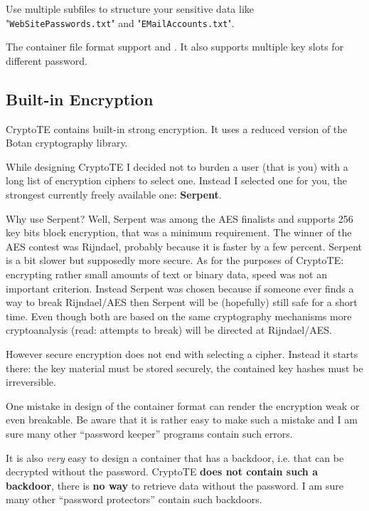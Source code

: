 \documentclass[a4paper,12pt,twoside]{article}
\begin{document}
Use multiple subfiles to structure your sensitive data like "\texttt{Web\-Site\-Passwords.txt}" and "\texttt{EMail\-Accounts.txt}".

The container file format support  and . It also supports multiple key slots for different password.

\subsection{Built-in Encryption}\label{Encryption}

CryptoTE contains built-in strong encryption. It uses a reduced version of the Botan cryptography library.

While designing CryptoTE I decided not to burden a user (that is you) with a long list of encryption ciphers to select one. Instead I selected one for you, the strongest currently freely available one: \textbf{Serpent}.

Why use Serpent? Well, Serpent was among the AES finalists and supports 256 key bits block encryption, that was a minimum requirement. The winner of the AES contest was Rijndael, probably because it is faster by a few percent. Serpent is a bit slower but supposedly more secure. As for the purposes of CryptoTE: encrypting rather small amounts of text or binary data, speed was not an important criterion. Instead Serpent was chosen because if someone ever finds a way to break Rijndael/AES then Serpent will be (hopefully) still safe for a short time. Even though both are based on the same cryptography mechanisms more cryptoanalysis (read: attempts to break) will be directed at Rijndael/AES.

However secure encryption does not end with selecting a cipher. Instead it starts there: the key material must be stored securely, the contained key hashes must be irreversible.

One mistake in design of the container format can render the encryption weak or even breakable. Be aware that it is rather easy to make such a mistake and I am sure many other ``password keeper'' programs contain such errors.

It is also \emph{very} easy to design a container that has a backdoor, i.e. that can be decrypted without the password. CryptoTE \textbf{does not contain such a backdoor}, there is \textbf{no way} to retrieve data without the password. I am sure many other ``password protectors'' contain such backdoors.
\end{document}
